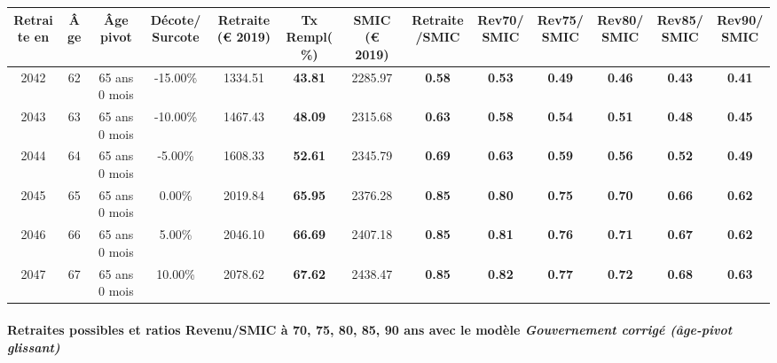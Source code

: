 { \scriptsize \begin{center} 
\begin{tabular}[htb]{|c|c||c|c||c|c||c||c|c|c|c|c|c|} 
\hline 
 Retraite en &  Âge &  Âge pivot &  Décote/Surcote &  Retraite (\euro{} 2019) &  Tx Rempl(\%) &  SMIC (\euro{} 2019) &  Retraite/SMIC &  Rev70/SMIC &  Rev75/SMIC &  Rev80/SMIC &  Rev85/SMIC &  Rev90/SMIC \\ 
\hline \hline 
 2042 &  62 &  65 ans 0 mois &  -15.00\% &  1334.51 &  {\bf 43.81} &  2285.97 &  {\bf {\color{red} 0.58}} &  {\bf {\color{red} 0.53}} &  {\bf {\color{red} 0.49}} &  {\bf {\color{red} 0.46}} &  {\bf {\color{red} 0.43}} &  {\bf {\color{red} 0.41}} \\ 
\hline 
 2043 &  63 &  65 ans 0 mois &  -10.00\% &  1467.43 &  {\bf 48.09} &  2315.68 &  {\bf {\color{red} 0.63}} &  {\bf {\color{red} 0.58}} &  {\bf {\color{red} 0.54}} &  {\bf {\color{red} 0.51}} &  {\bf {\color{red} 0.48}} &  {\bf {\color{red} 0.45}} \\ 
\hline 
 2044 &  64 &  65 ans 0 mois &  -5.00\% &  1608.33 &  {\bf 52.61} &  2345.79 &  {\bf {\color{red} 0.69}} &  {\bf {\color{red} 0.63}} &  {\bf {\color{red} 0.59}} &  {\bf {\color{red} 0.56}} &  {\bf {\color{red} 0.52}} &  {\bf {\color{red} 0.49}} \\ 
\hline 
 2045 &  65 &  65 ans 0 mois &  0.00\% &  2019.84 &  {\bf 65.95} &  2376.28 &  {\bf {\color{red} 0.85}} &  {\bf {\color{red} 0.80}} &  {\bf {\color{red} 0.75}} &  {\bf {\color{red} 0.70}} &  {\bf {\color{red} 0.66}} &  {\bf {\color{red} 0.62}} \\ 
\hline 
 2046 &  66 &  65 ans 0 mois &  5.00\% &  2046.10 &  {\bf 66.69} &  2407.18 &  {\bf {\color{red} 0.85}} &  {\bf {\color{red} 0.81}} &  {\bf {\color{red} 0.76}} &  {\bf {\color{red} 0.71}} &  {\bf {\color{red} 0.67}} &  {\bf {\color{red} 0.62}} \\ 
\hline 
 2047 &  67 &  65 ans 0 mois &  10.00\% &  2078.62 &  {\bf 67.62} &  2438.47 &  {\bf {\color{red} 0.85}} &  {\bf {\color{red} 0.82}} &  {\bf {\color{red} 0.77}} &  {\bf {\color{red} 0.72}} &  {\bf {\color{red} 0.68}} &  {\bf {\color{red} 0.63}} \\ 
\hline 
\hline 
\end{tabular} 
\end{center} } 
\paragraph{Retraites possibles et ratios Revenu/SMIC à 70, 75, 80, 85, 90 ans avec le modèle \emph{Gouvernement corrigé (âge-pivot glissant)}}  
 

